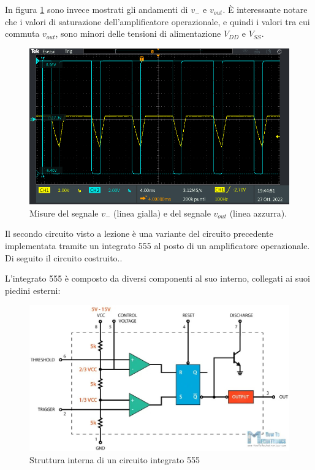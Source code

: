 In figura \ref{fig:segnale_uscita} sono invece mostrati gli andamenti di $v_{-}$ e $v_{out}$. È interessante notare che i valori di saturazione dell'amplificatore operazionale, e quindi i valori tra cui commuta $v_{out}$, sono minori delle tensioni di alimentazione $V_{DD}$ e $V_{SS}$.
\begin{figure}[h!]
	\centering
	\includegraphics[width=\linewidth]{./ImageFiles/Laboratorio 4/TEK00008.PNG}
	\caption{Misure del segnale $v_{-}$ (linea gialla) e del segnale $v_{out}$ (linea azzurra).}
	\label{fig:segnale_uscita}
\end{figure}
\newpage
Il secondo circuito visto a lezione è una variante del circuito precedente implementata tramite un integrato 555 al posto di un amplificatore operazionale. Di seguito il circuito costruito..

L'integrato 555 è composto da diversi componenti al suo interno, collegati ai suoi piedini esterni:
\begin{figure}[h!]
	\centering
	\includegraphics[width=\linewidth]{./ImageFiles/Laboratorio 4/555internals.jpg}
	\caption{Struttura interna di un circuito integrato 555}
	\label{fig:555_internals}
\end{figure}


